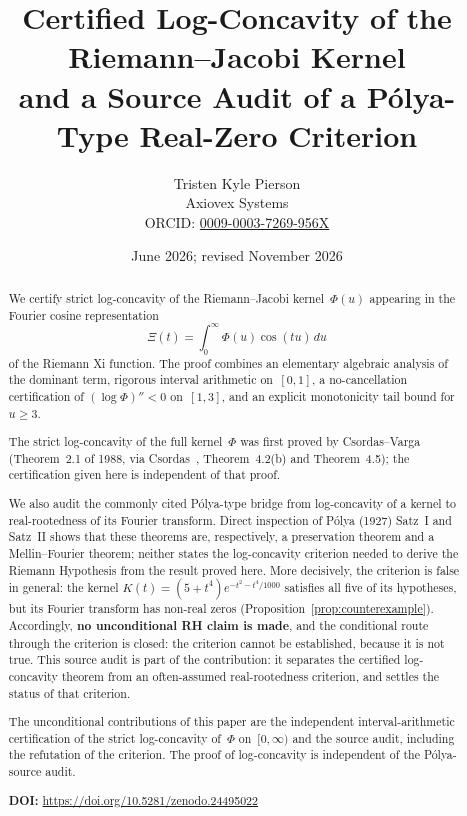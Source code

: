 \documentclass[11pt]{article}
\title{Certified Log-Concavity of the Riemann--Jacobi Kernel\\
and a Source Audit of a P\'{o}lya-Type Real-Zero Criterion}
\author{Tristen Kyle Pierson\\
  Axiovex Systems\\
  \small ORCID: \href{https://orcid.org/0009-0003-7269-956X}{0009-0003-7269-956X}}
\date{June 2026; revised November 2026}
\theoremstyle{definition}
\theoremstyle{remark}
\newcommand{\doiurl}{\url{https://doi.org/10.5281/zenodo.24495022}}
\begin{document}
\maketitle

\begin{abstract}
We certify strict log-concavity of the Riemann--Jacobi kernel~$\Phi(u)$
appearing in the Fourier cosine representation
\[
\Xi(t) = \int_0^\infty \Phi(u)\cos(tu)\,du
\]
of the Riemann Xi function.
The proof combines an elementary algebraic analysis of the dominant term,
rigorous interval arithmetic on~$[0,1]$, a no-cancellation certification
of $(\log\Phi)'' < 0$ on~$[1,3]$, and an explicit monotonicity tail bound for~$u\geq 3$.

The strict log-concavity of the full kernel~$\Phi$ was first proved by
Csordas--Varga~\cite{csordas1988} (Theorem~2.1 of 1988, via
Csordas~\cite{csordas2015}, Theorem~4.2(b) and Theorem~4.5); the
certification given here is independent of that proof.

We also audit the commonly cited P\'{o}lya-type bridge from log-concavity of a
kernel to real-rootedness of its Fourier transform.
Direct inspection of P\'{o}lya (1927) Satz~I and Satz~II shows that these theorems
are, respectively, a preservation theorem and a Mellin--Fourier theorem; neither states
the log-concavity criterion needed to derive the Riemann Hypothesis from the result
proved here.
More decisively, the criterion is false in general: the kernel
$K(t) = (5+t^4)e^{-t^2-t^4/1000}$ satisfies all five of its hypotheses, but its
Fourier transform has non-real zeros (Proposition~\ref{prop:counterexample}).
Accordingly, \textbf{no unconditional RH claim is made}, and the conditional
route through the criterion is closed: the criterion cannot be established,
because it is not true.
This source audit is part of the contribution: it separates the certified
log-concavity theorem from an often-assumed real-rootedness criterion, and
settles the status of that criterion.

The unconditional contributions of this paper are the independent
interval-arithmetic certification of the strict log-concavity
of~$\Phi$ on~$[0,\infty)$ and the source audit, including the refutation of
the criterion.
The proof of log-concavity is independent of the P\'{o}lya-source audit.

\medskip\noindent
\textbf{DOI:} \doiurl
\end{abstract}

\end{document}
